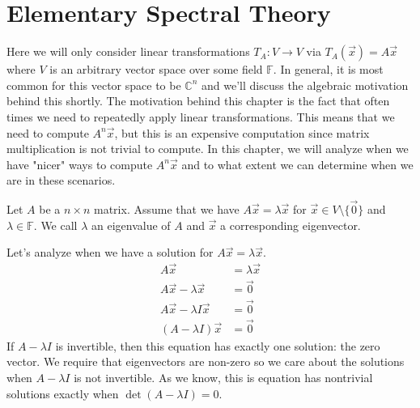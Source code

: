\chapter{Elementary Spectral Theory}

Here we will only consider linear transformations $T_A:V\to V$ via $T_A(\vec{x})=A\vec{x}$ where $V$ is an arbitrary vector space over some field $\mathbb{F}$. In general, it is most common for this vector space to be $\mathbb{C}^n$ and we'll discuss the algebraic motivation behind this shortly. The motivation behind this chapter is the fact that often times we need to repeatedly apply linear transformations. This means that we need to compute $A^n\vec{x}$, but this is an expensive computation since matrix multiplication is not trivial to compute. In this chapter, we will analyze when we have "nicer" ways to compute $A^n\vec{x}$ and to what extent we can determine when we are in these scenarios.
\begin{definition}
    Let $A$ be a $n\times n$ matrix. Assume that we have $A\vec{x}=\lambda\vec{x}$ for $\vec{x}\in V\setminus\{\vec{0}\}$ and $\lambda\in\mathbb{F}$. We call $\lambda$ an eigenvalue of $A$ and $\vec{x}$ a corresponding eigenvector.
\end{definition}
Let's analyze when we have a solution for $A\vec{x}=\lambda\vec{x}$.
\begin{align*}
    A\vec{x}&=\lambda\vec{x}\\
    A\vec{x}-\lambda\vec{x}&=\vec{0}\\
    A\vec{x}-\lambda I\vec{x}&=\vec{0}\\
    (A-\lambda I)\vec{x}&=\vec{0}
\end{align*}
If $A-\lambda I$ is invertible, then this equation has exactly one solution: the zero vector. We require that eigenvectors are non-zero so we care about the solutions when $A-\lambda I$ is not invertible. As we know, this is equation has nontrivial solutions exactly when $\det(A-\lambda I)=0$.
